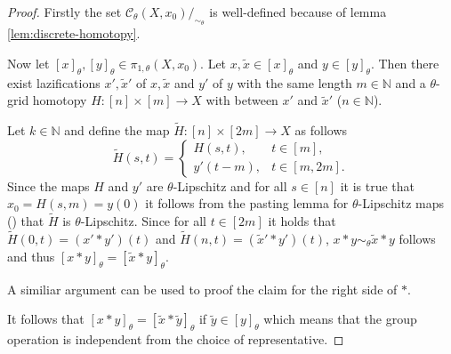 \documentclass[a4paper, 11pt, twoside]{article}
\newcommand{\N}[0]{\mathbb{N}}
\theoremstyle{break}
\theoremstyle{break}
\begin{document}
\begin{proof}
  Firstly the set $\mathcal{C}_{\theta}(X, x_0)/_{\sim_{\theta}}$ is well-defined because of lemma \ref{lem:discrete-homotopy}.

  Now let $[x]_{\theta}, [y]_{\theta} \in \pi_{1, \theta}(X, x_0)$. Let $x, \tilde{x} \in [x]_{\theta}$ and $y \in [y]_{\theta}$.
  Then there exist lazifications $x', \tilde{x}'$ of $x, \tilde{x}$ and $y'$ of $y$ with the same length $m \in \N$ 
  and a $\theta$-grid homotopy $H\colon [n] \times [m] \to X$ with between $x'$ and $\tilde{x}'$ ($n \in \N$).

  Let $k \in \N$ and define the map $\tilde{H}\colon [n] \times [2m] \to X$ as follows
  \begin{equation*}
    \tilde{H}(s, t) = \begin{cases}
       H(s, t), &t \in [m], \\
       y'(t-m), &t \in [m,2m].
    \end{cases}
  \end{equation*}
  Since the maps $H$ and $y'$ are $\theta$-Lipschitz and for all $s \in [n]$ it is true that $x_0 = H(s,m) = y(0)$ 
  it follows from the pasting lemma for $\theta$-Lipschitz maps (\cite[Thm. 1]{kvalheim2021pasting}) that $\tilde{H}$ is $\theta$-Lipschitz.
  Since for all $t \in [2m]$ it holds that $\tilde{H}(0, t) = (x' * y')(t)$ and $\tilde{H}(n, t) = (\tilde{x}' * y')(t)$,
  $x * y \sim_{\theta} \tilde{x} * y$ follows and thus $[x * y]_{\theta} = [\tilde{x} * y]_\theta$.

  A similiar argument can be used to proof the claim for the right side of $*$. 
  
  It follows that $[x * y]_{\theta} = [\tilde{x} * \tilde{y}]_{\theta}$ if $\tilde{y} \in [y]_\theta$ 
  which means that the group operation is independent from the choice of representative.


\end{proof}
\end{document}
